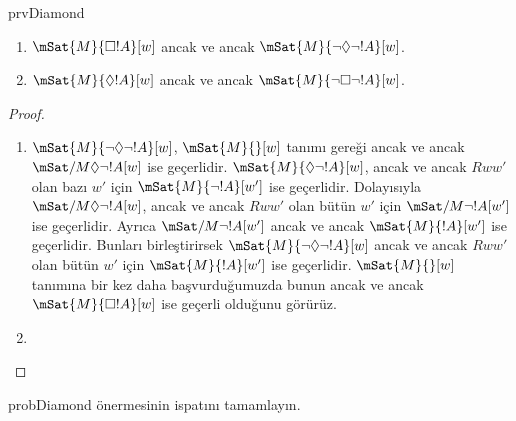 \begin{tagblock}{prvDiamond}
\begin{prop}
  \begin{enumerate}
  \item $\mSat{M}{\Box !A}[w]$ ancak ve ancak
    $\mSat{M}{\lnot\Diamond\lnot !A}[w]$.
  \item $\mSat{M}{\Diamond !A}[w]$ ancak ve ancak
    $\mSat{M}{\lnot\Box\lnot !A}[w]$.
  \end{enumerate}
\end{prop}

\begin{proof}
  \begin{enumerate}
    \item $\mSat{M}{\lnot\Diamond\lnot !A}[w]$, $\mSat{M}{}[w]$ tanımı
      gereği ancak ve ancak $\mSat/{M}{\Diamond\lnot !A}[w]$ ise geçerlidir.
      $\mSat{M}{\Diamond\lnot !A}[w]$, ancak ve ancak $Rww'$ olan bazı
      $w'$ için $\mSat{M}{\lnot !A}[w']$ ise geçerlidir. Dolayısıyla
      $\mSat/{M}{\Diamond\lnot !A}[w]$, ancak ve ancak $Rww'$ olan bütün
      $w'$ için $\mSat/{M}{\lnot !A}[w']$ ise geçerlidir. Ayrıca
      $\mSat/{M}{\lnot !A}[w']$ ancak ve ancak $\mSat{M}{!A}[w']$ ise
      geçerlidir. Bunları birleştirirsek
      $\mSat{M}{\lnot\Diamond\lnot !A}[w]$ ancak ve ancak $Rww'$ olan bütün
      $w'$ için $\mSat{M}{!A}[w']$ ise geçerlidir. $\mSat{M}{}[w]$ tanımına
      bir kez daha başvurduğumuzda bunun ancak ve ancak
      $\mSat{M}{\Box !A}[w]$ ise geçerli olduğunu görürüz.
    \item {}
  \end{enumerate}
\end{proof}

\begin{probtag}{probDiamond}
   önermesinin ispatını tamamlayın.
\end{probtag}
\end{tagblock}

